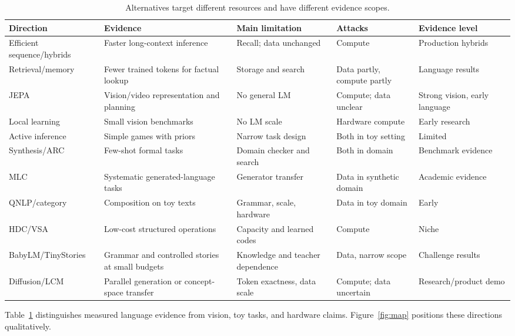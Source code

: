 \begin{table}[ht]
\centering\scriptsize
\begin{tabular}{p{2.7cm}p{3.4cm}p{2.4cm}p{2.4cm}p{2.1cm}}
\toprule Direction & Evidence & Main limitation & Attacks & Evidence level \\
\midrule Efficient sequence/hybrids & Faster long-context inference & Recall; data unchanged & Compute & Production hybrids \\
Retrieval/memory & Fewer trained tokens for factual lookup & Storage and search & Data partly, compute partly & Language results \\
JEPA & Vision/video representation and planning & No general LM & Compute; data unclear & Strong vision, early language \\
Local learning & Small vision benchmarks & No LM scale & Hardware compute & Early research \\
Active inference & Simple games with priors & Narrow task design & Both in toy setting & Limited \\
Synthesis/ARC & Few-shot formal tasks & Domain checker and search & Both in domain & Benchmark evidence \\
MLC & Systematic generated-language tasks & Generator transfer & Data in synthetic domain & Academic evidence \\
QNLP/category & Composition on toy texts & Grammar, scale, hardware & Data in toy domain & Early \\
HDC/VSA & Low-cost structured operations & Capacity and learned codes & Compute & Niche \\
BabyLM/TinyStories & Grammar and controlled stories at small budgets & Knowledge and teacher dependence & Data, narrow scope & Challenge results \\
Diffusion/LCM & Parallel generation or concept-space transfer & Token exactness, data scale & Compute; data uncertain & Research/product demo \\
\bottomrule
\end{tabular}
\caption{Alternatives target different resources and have different evidence scopes.}
\label{tab:post}
\end{table}
Table~\ref{tab:post} distinguishes measured language evidence from vision, toy tasks, and hardware claims. Figure~\ref{fig:map} positions these directions qualitatively.

